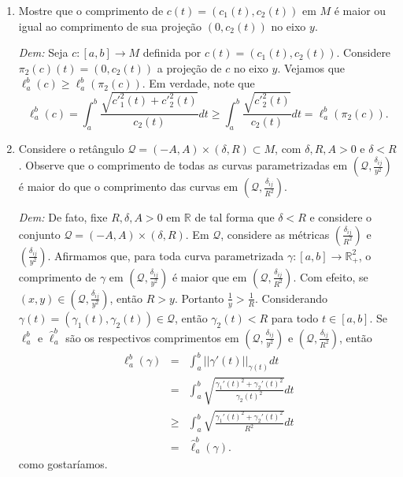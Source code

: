 \documentclass[twoside,openright,titlepage,numbers=noenddot,headinclude,  lineheaders footinclude=true,cleardoublepage=empty,BCOR=5mm,paper=a4,fontsize=12pt ]{scrbook}
\newcommand{\R}{\mathbb R}
\newcommand{\oo}{_}
\begin{document}
\begin{enumerate}
    
    \item Mostre que o comprimento de $c(t) = (c_1(t), c_2(t))$ em $M$ é maior ou igual ao comprimento de sua projeção $(0, c_2(t))$ no eixo $y$. 
    
    \noindent\textit{Dem:} Seja $c:[a,b]\rightarrow M$ definida por $c(t) = (c \oo 1 (t), c \oo 2 (t))$.
    Considere $\pi \oo 2 (c) (t) =(0, c \oo 2 (t)) $ a projeção de $c$ no eixo $y$. 
    Vejamos que $\ell \oo a ^b (c) \geq  \ell \oo a ^b (\pi \oo 2 (c))$. 
    Em verdade, note que
    \[
        \ell \oo a ^b (c) = \int \oo a ^b \dfrac{\sqrt{{c'} ^2 \oo 1 (t) + {c'}^2 \oo 2 (t)}}{c\oo 2 (t)} dt \geq \int \oo a ^b \dfrac{\sqrt{{c'} ^2 \oo 2 (t) }}{c\oo 2 (t)} dt  = \ell  \oo a ^b (\pi \oo 2 (c)).
    \]
    \item Considere o retângulo $\mathcal{Q} = (-A, A) \times (\delta, R) \subset M$, com $\delta, R, A > 0$ e $\delta < R$. Observe que o comprimento de todas as curvas parametrizadas em $\left( \mathcal{Q}, \frac{\delta _{ij}}{y^2} \right)$ é maior do que o comprimento das curvas em $\left( \mathcal{Q}, \frac{\delta _{ij}}{R^2} \right)$. 
    
    \noindent\textit{Dem:} De fato, fixe $R, \delta, A > 0$ em $\mathbb{R}$ de tal forma que $\delta < R$ e considere o conjunto $\mathcal{Q} = (-A,A) \times (\delta,R)$. 
    Em $\mathcal{Q}$, considere as métricas $\left(\frac{\delta_{ij}}{R^2}\right)$ e $\left(\frac{\delta_{ij}}{y^2}\right)$.
    Afirmamos que, para toda curva parametrizada $\gamma: [a,b] \longrightarrow \R^2_{+}$, o comprimento de $\gamma$ em $\left(\mathcal{Q},\frac{\delta_{ij}}{y^2}\right)$ é maior que em $\left(\mathcal{Q},\frac{\delta_{ij}}{R^2}\right)$.
    Com efeito, se $(x,y) \in \left(\mathcal{Q},\frac{\delta_{ij}}{y^2}\right)$, então $R > y.$
    Portanto $\frac{1}{y} > \frac{1}{R}$.
    Considerando $\gamma(t) = (\gamma_1(t),\gamma_2(t)) \in \mathcal{Q}$, então $\gamma_2(t) < R$ para todo $t \in [a,b]$. 
    Se $\ell_a^b$ e $\hat{\ell}_a^{b}$ são os respectivos comprimentos em $\left( \mathcal{Q}, \frac{\delta _{ij}}{y^2} \right)$ e $\left( \mathcal{Q},  \frac{\delta _{ij}}{R^2} \right)$, então 
    \begin{eqnarray*}
        \ell_a^b(\gamma) &=&\int_a^b ||\gamma'(t)||_{\gamma(t)}dt \\
        &=&\int_a^b \sqrt{\frac{\gamma_1'(t)^2 + \gamma_2'(t)^2}{\gamma_2(t)^2}} dt\\
        &\geq& \int_a^b \sqrt{\frac{\gamma_1'(t)^2 + \gamma_2'(t)^2}{R^2}}dt\\
        &=&\hat{\ell}_a^b(\gamma). 
    \end{eqnarray*}
    como gostaríamos.  
    

\end{enumerate}
\end{document}
